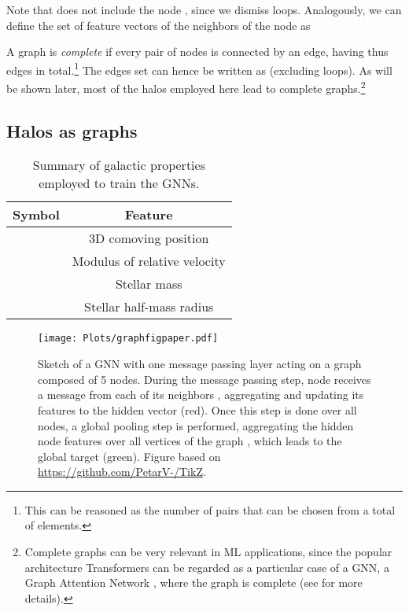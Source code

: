\documentclass[twocolumn]{aastex631}
\begin{document}
Note that  does not include the node , since we dismiss loops. Analogously, we can define the set of feature vectors of the neighbors of the node  as

A graph is \textit{complete} if every pair of nodes is connected by an edge, having thus  edges in total.\footnote{This can be reasoned as the number of pairs that can be chosen from a total of  elements.} The edges set can hence be written as  (excluding loops). As will be shown later, most of the halos employed here lead to complete graphs.\footnote{Complete graphs can be very relevant in ML applications, since the popular architecture Transformers \citep{2017arXiv170603762V} can be regarded as a particular case of a GNN, a Graph Attention Network \citep{velickovic2018graph}, where the graph is complete (see \citealt{2021arXiv210413478B} for more details).}


\subsection{Halos as graphs}
\label{sec:halosasgraphs}

\begin{table}
	\begin{center}
\setlength{\tabcolsep}{10pt}    \renewcommand{\arraystretch}{1.3}   \begin{tabular}{|c|c|}
			\hline
			Symbol & Feature \\
			\hline
			\hline
			  & 3D comoving position \\ 
			 \hline
			  & Modulus of relative velocity \\ 
			 \hline
			  & Stellar mass \\
			 \hline
			  & Stellar half-mass radius \\
			 \hline
		\end{tabular}
\end{center}
	\caption{Summary of galactic properties employed to train the GNNs.}
	\label{table:features}
\end{table}

\begin{figure*}[th!]
\begin{center}
\texttt{[image: Plots/graphfigpaper.pdf]}
\caption{Sketch of a GNN with one message passing layer acting on a graph  composed of 5 nodes. During the message passing step, node  receives a message from each of its neighbors , aggregating and updating its features to the hidden vector  (red). Once this step is done over all nodes, a global pooling step is performed, aggregating the hidden node features over all vertices of the graph , which leads to the global target  (green). Figure based on \url{https://github.com/PetarV-/TikZ}.}
\label{fig:messagepassing}
\end{center}
\end{figure*}
\end{document}
